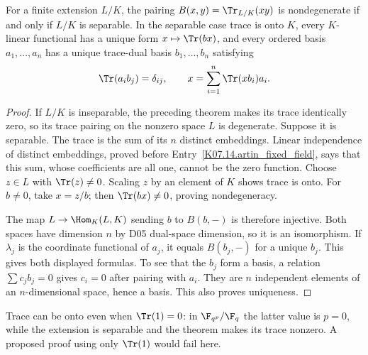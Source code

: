 \begin{theorem}
For a finite extension $L/K$, the pairing $B(x,y)=\Tr_{L/K}(xy)$ is nondegenerate if and only if $L/K$ is separable. In the separable case trace is onto $K$, every $K$-linear functional has a unique form $x\mapsto\Tr(bx)$, and every ordered basis $a_1,\ldots,a_n$ has a unique trace-dual basis $b_1,\ldots,b_n$ satisfying
\[
\Tr(a_i b_j)=\delta_{ij},\qquad x=\sum_{i=1}^n\Tr(xb_i)a_i.
\]
\end{theorem}
\begin{proof}
If $L/K$ is inseparable, the preceding theorem makes its trace identically zero, so its trace pairing on the nonzero space $L$ is degenerate. Suppose it is separable. The trace is the sum of its $n$ distinct embeddings. Linear independence of distinct embeddings, proved before Entry~\ref{K07.14.artin_fixed_field}, says that this sum, whose coefficients are all one, cannot be the zero function. Choose $z\in L$ with $\Tr(z)\ne0$. Scaling $z$ by an element of $K$ shows trace is onto. For $b\ne0$, take $x=z/b$; then $\Tr(bx)\ne0$, proving nondegeneracy.

The map $L\to\Hom_K(L,K)$ sending $b$ to $B(b,-)$ is therefore injective. Both spaces have dimension $n$ by D05 dual-space dimension, so it is an isomorphism. If $\lambda_j$ is the coordinate functional of $a_j$, it equals $B(b_j,-)$ for a unique $b_j$. This gives both displayed formulas. To see that the $b_j$ form a basis, a relation $\sum c_j b_j=0$ gives $c_i=0$ after pairing with $a_i$. They are $n$ independent elements of an $n$-dimensional space, hence a basis. This also proves uniqueness.
\end{proof}
\begin{example}
Trace can be onto even when $\Tr(1)=0$: in $\F_{q^p}/\F_q$ the latter value is $p=0$, while the extension is separable and the theorem makes its trace nonzero. A proposed proof using only $\Tr(1)$ would fail here.
\end{example}

